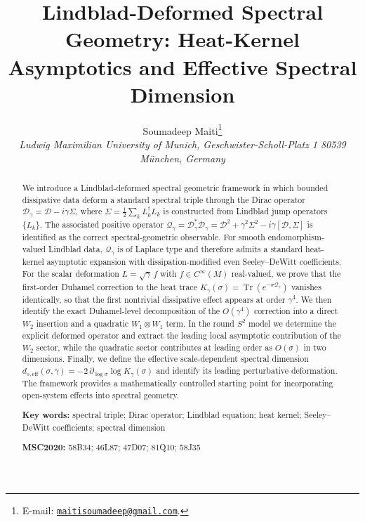 \documentclass[11pt,a4paper]{article}
\numberwithin{equation}{section}
\theoremstyle{definition}
\newcommand{\cD}{\mathcal{D}}
\newcommand{\Qg}{\mathcal{Q}_\gamma}
\newcommand{\Dg}{\mathcal{D}_\gamma}
\newcommand{\Sig}{\Sigma}
\newcommand{\Tr}{\operatorname{Tr}}
\begin{document}
\title{\textbf{Lindblad-Deformed Spectral Geometry: Heat-Kernel
    Asymptotics and Effective Spectral Dimension}}

\author{Soumadeep Maiti\thanks{E-mail:
  \href{mailto:maitisoumadeep@gmail.com}{\texttt{maitisoumadeep@gmail.com}}.}\\[4pt]
  \small\itshape Ludwig Maximilian University
  of Munich, Geschwister-Scholl-Platz 1 80539 München, Germany}

\date{}
\maketitle
\thispagestyle{empty}

\begin{abstract}
\noindent
We introduce a Lindblad-deformed spectral geometric framework in which
bounded dissipative data deform a standard spectral triple through the
Dirac operator $\Dg=\cD-i\gamma\Sig$, where
$\Sig=\frac{1}{2}\sum_k L_k^\dagger L_k$ is constructed from Lindblad
jump operators $\{L_k\}$. The associated positive operator
$\Qg=\Dg^*\Dg=\cD^2+\gamma^2\Sig^2-i\gamma[\cD,\Sig]$ is identified as
the correct spectral-geometric observable. For smooth endomorphism-valued
Lindblad data, $\Qg$ is of Laplace type and therefore admits a standard
heat-kernel asymptotic expansion with dissipation-modified even
Seeley--DeWitt coefficients. For the scalar deformation
$L=\sqrt{\gamma}\,f$ with $f\in C^\infty(M)$ real-valued, we prove that
the first-order Duhamel correction to the heat trace
$K_\gamma(\sigma)=\Tr(e^{-\sigma\Qg})$ vanishes identically, so that the
first nontrivial dissipative effect appears at order $\gamma^4$. We then
identify the exact Duhamel-level decomposition of the $O(\gamma^4)$
correction into a direct $W_2$ insertion and a quadratic $W_1\otimes W_1$
term. In the round $S^2$ model we determine the explicit deformed operator
and extract the leading local asymptotic contribution of the $W_2$ sector,
while the quadratic sector contributes at leading order as $O(\sigma)$ in
two dimensions. Finally, we define the effective scale-dependent spectral
dimension $d_{s,\mathrm{eff}}(\sigma,\gamma)=
-2\,\partial_{\log\sigma}\log K_\gamma(\sigma)$ and identify its leading
perturbative deformation. The framework provides a mathematically
controlled starting point for incorporating open-system effects into
spectral geometry.

\medskip\noindent
\textbf{Key words:} spectral triple; Dirac operator; Lindblad equation;
heat kernel; Seeley--DeWitt coefficients; spectral dimension

\medskip\noindent
\textbf{MSC2020:} 58B34; 46L87; 47D07; 81Q10; 58J35
\end{abstract}
\end{document}
